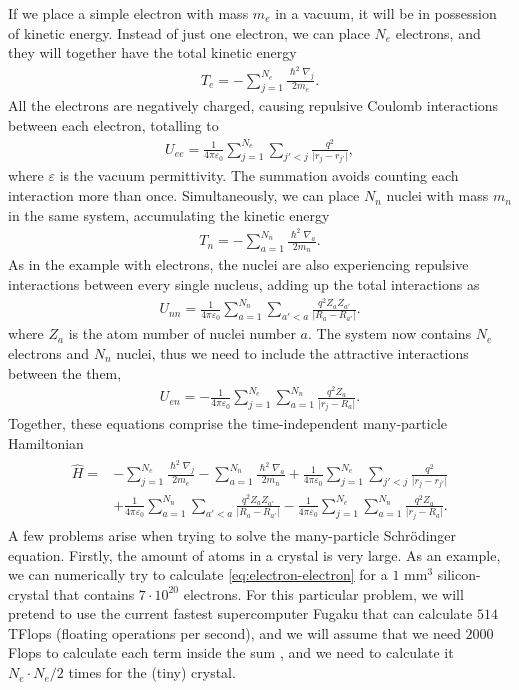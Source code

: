 If we place a simple electron with mass $m_e$ in a vacuum, it will be in possession of kinetic energy. Instead of just one electron, we can place $N_e$ electrons, and they will together have the total kinetic energy
\begin{align}
  T_e = - \sum_{j=1}^{N_e} \frac{\hslash^2\nabla_j}{2m_e}.
\end{align}
All the electrons are negatively charged, causing repulsive Coulomb interactions between each electron, totalling to
\begin{align}
  U_{ee} = \frac{1}{4\pi\varepsilon_0}\sum_{j=1}^{N_e}\sum_{j'<j} \frac{q^2}{\lvert r_j - r_{j'}\rvert},
  \label{eq:electron-electron}
\end{align}
where $\varepsilon$ is the vacuum permittivity. The summation avoids counting each interaction more than once. Simultaneously, we can place $N_n$ nuclei with mass $m_n$ in the same system, accumulating the kinetic energy
\begin{align}
  T_n = - \sum_{a=1}^{N_n} \frac{\hslash^2\nabla_a}{2m_n}.
\end{align}
As in the example with electrons, the nuclei are also experiencing repulsive interactions between every single nucleus, adding up the total interactions as
\begin{align}
  U_{nn} = \frac{1}{4\pi\varepsilon_0}\sum_{a=1}^{N_n}\sum_{a'<a} \frac{q^2 Z_aZ_{a'}}{\lvert R_a - R_{a'}\rvert }.
\end{align}
where $Z_a$ is the atom number of nuclei number $a$. The system now contains $N_e$ electrons and $N_n$ nuclei, thus we need to include the attractive interactions between the them,
\begin{align}
  U_{en} = - \frac{1}{4\pi\varepsilon_0}\sum_{j=1}^{N_e} \sum_{a=1}^{N_n} \frac{q^2Z_a}{\lvert r_j-R_a\rvert}.
\end{align} Together, these equations comprise the time-independent many-particle Hamiltonian
\begin{align}
  \begin{aligned}
    \hat{H} = &- \sum_{j=1}^{N_e} \frac{\hslash^2\nabla_j}{2m_e}
    - \sum_{a=1}^{N_n} \frac{\hslash^2\nabla_a}{2m_n}
    + \frac{1}{4\pi\varepsilon_0} \sum_{j=1}^{N_e}\sum_{j'<j} \frac{q^2}{\lvert r_j - r_{j'}\rvert} \\
    &+\frac{1}{4\pi\varepsilon_0}\sum_{a=1}^{N_n}\sum_{a'<a} \frac{q^2 Z_aZ_{a'}}{\lvert R_a - R_{a'}\rvert } - \frac{1}{4\pi\varepsilon_0}\sum_{j=1}^{N_e} \sum_{a=1}^{N_n} \frac{q^2Z_a}{\lvert r_j-R_a\rvert}.
  \end{aligned}
\end{align} A few problems arise when trying to solve the many-particle Schrödinger equation. Firstly, the amount of atoms in a crystal is very large. As an example, we can numerically try to calculate \autoref{eq:electron-electron} for a $1$ mm$^3$ silicon-crystal that contains $7\cdot 10^{20}$ electrons. For this particular problem, we will pretend to use the current fastest supercomputer Fugaku \cite{Top500} that can calculate $514$ TFlops (floating operations per second), and we will assume that we need $2000$ Flops to calculate each term inside the sum \cite{Persson2020}, and we need to calculate it $N_e \cdot N_e/2$ times for the (tiny) crystal.
